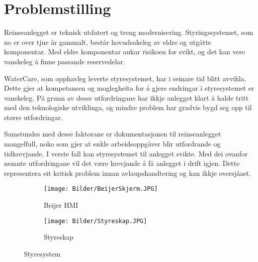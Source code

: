 \section{Problemstilling}
Reinseanlegget er teknisk utdatert og treng modernisering. Styringssystemet, som no er over tjue år gammalt,
består hovudsakeleg av eldre og utgåtte komponentar. Med eldre komponentar aukar risikoen for svikt, 
og det kan vere vanskeleg å finne passande reservedelar.

WaterCare, som opphavleg leverte styresystemet, har i seinare tid blitt avvikla. Dette gjer at kompetansen 
og moglegheita for å gjere endringar i styresystemet er vanskeleg. 
På grunn av desse utfordringane har ikkje anlegget klart å halde tritt med den teknologiske utviklinga, 
og mindre problem har gradvis bygd seg opp til større utfordringar.

Samstundes med desse faktorane er dokumentasjonen til reinseanlegget mangelfull, noko som gjer at enkle arbeidsoppgåver blir utfordrande og tidkrevjande.
I verste fall kan styresystemet til anlegget svikte. Med dei ovanfor nemnte utfordringane vil det være krevjande
å få anlegget i drift igjen. Dette representera eit kritisk problem innan avlaupshandtering og kan ikkje oversjåast.
\newline





\begin{figure}[htbp]
    \centering
    \begin{subfigure}[b]{0.5\textwidth}
        \centering
        \texttt{[image: Bilder/BeijerSkjerm.JPG]}
        \caption{Beijer HMI}\label{fig:subfig1}
    \end{subfigure}
    \hfill
    \begin{subfigure}[b]{0.3\textwidth}
        \centering
        \texttt{[image: Bilder/Styreskap.JPG]}
        \caption{Styreskap}\label{fig:subfig2}
    \end{subfigure}
    \caption{Styresystem}\label{fig:Styresystem}
\end{figure}